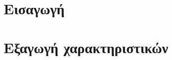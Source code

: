 \documentclass[12pt]{article}
\begin{document}
\maketitle \newpage
{}
\tableofcontents \newpage

\section{Εισαγωγή}


\section{Εξαγωγή χαρακτηριστικών}

\end{document}
